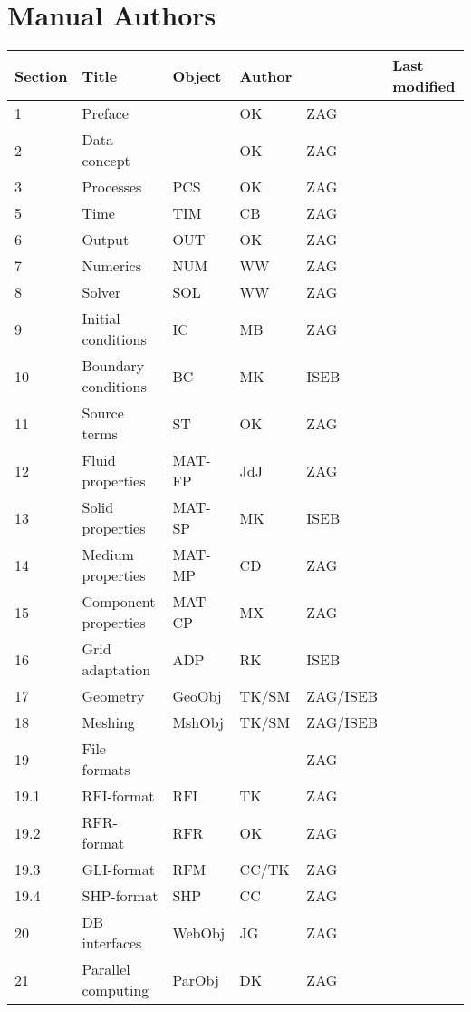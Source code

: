 \section{Manual Authors}

\begin{center}
\begin{tabular}{|l|l|l|l|l|l|}
\hline
Section & Title & Object & Author & & Last modified \\
\hline \hline
%
1 & Preface              &     & OK & ZAG &  \\
2 & Data concept         &     & OK & ZAG &  \\
3 & Processes            & PCS & OK & ZAG &  \\
5 & Time                 & TIM & CB & ZAG &  \\
6 & Output               & OUT & OK & ZAG &  \\
7 & Numerics             & NUM & WW & ZAG &  \\
8 & Solver               & SOL & WW & ZAG &  \\
9  & Initial conditions  & IC  & MB & ZAG &  \\
10 & Boundary conditions & BC  & MK & ISEB &  \\
11 & Source terms        & ST  & OK & ZAG &  \\
12 & Fluid properties    & MAT-FP & JdJ & ZAG &  \\
13 & Solid properties    & MAT-SP & MK & ISEB &  \\
14 & Medium properties   & MAT-MP & CD & ZAG &  \\
15 & Component properties & MAT-CP & MX & ZAG &  \\
16 & Grid adaptation      & ADP & RK & ISEB &  \\
17 & Geometry             & GeoObj & TK/SM & ZAG/ISEB &  \\
18 & Meshing              & MshObj & TK/SM & ZAG/ISEB &  \\
\hline
19 & File formats         &     &    & ZAG &  \\
19.1 & RFI-format           & RFI & TK & ZAG &  \\
19.2 & RFR-format           & RFR & OK & ZAG &  \\
19.3 & GLI-format           & RFM & CC/TK & ZAG &  \\
19.4 & SHP-format           & SHP & CC & ZAG &  \\
\hline
20 & DB interfaces        & WebObj & JG & ZAG &  \\
21 & Parallel computing   & ParObj & DK & ZAG &  \\
\hline
\end{tabular}
\end{center}
